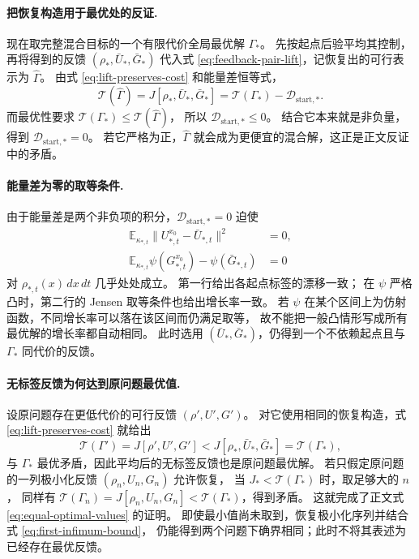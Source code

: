 \documentclass[UTF8,a4paper,11pt,fontset=fandol]{ctexart}
\begin{document}
\paragraph{把恢复构造用于最优处的反证.}
现在取完整混合目标的一个有限代价全局最优解 $\Gamma_*$。
先按起点后验平均其控制，再将得到的反馈 $(\rho_*,\bar U_*,\bar G_*)$
代入式 \eqref{eq:feedback-pair-lift}，记恢复出的可行表示为 $\widehat\Gamma$。
由式 \eqref{eq:lift-preserves-cost} 和能量差恒等式，
\begin{equation}
\mathcal T(\widehat\Gamma)
=J[\rho_*,\bar U_*,\bar G_*]
=\mathcal T(\Gamma_*)-\mathcal D_{\mathrm{start},*}.
\end{equation}
而最优性要求 $\mathcal T(\Gamma_*)\le\mathcal T(\widehat\Gamma)$，
所以 $\mathcal D_{\mathrm{start},*}\le0$。
结合它本来就是非负量，得到 $\mathcal D_{\mathrm{start},*}=0$。
若它严格为正，$\widehat\Gamma$ 就会成为更便宜的混合解，这正是正文反证中的矛盾。

\paragraph{能量差为零的取等条件.}
由于能量差是两个非负项的积分，$\mathcal D_{\mathrm{start},*}=0$ 迫使
\begin{equation}
\begin{aligned}
\mathbb E_{\kappa_{*,t}}\|U_{*,t}^{x_0}-\bar U_{*,t}\|^2&=0,\\
\mathbb E_{\kappa_{*,t}}\psi(G_{*,t}^{x_0})-\psi(\bar G_{*,t})&=0
\end{aligned}
\end{equation}
对 $\rho_{*,t}(x)\,dx\,dt$ 几乎处处成立。
第一行给出各起点标签的漂移一致；
在 $\psi$ 严格凸时，第二行的 Jensen 取等条件也给出增长率一致。
若 $\psi$ 在某个区间上为仿射函数，不同增长率可以落在该区间而仍满足取等，
故不能把一般凸情形写成所有最优解的增长率都自动相同。
此时选用 $(\bar U_*,\bar G_*)$，仍得到一个不依赖起点且与 $\Gamma_*$ 同代价的反馈。

\paragraph{无标签反馈为何达到原问题最优值.}
设原问题存在更低代价的可行反馈 $(\rho',U',G')$。
对它使用相同的恢复构造，式 \eqref{eq:lift-preserves-cost} 就给出
\begin{equation}
\mathcal T(\Gamma')=J[\rho',U',G']
<J[\rho_*,\bar U_*,\bar G_*]=\mathcal T(\Gamma_*),
\end{equation}
与 $\Gamma_*$ 最优矛盾，因此平均后的无标签反馈也是原问题最优解。
若只假定原问题的一列极小化反馈 $(\rho_n,U_n,G_n)$ 允许恢复，
当 $J_*<\mathcal T(\Gamma_*)$ 时，取足够大的 $n$，
同样有 $\mathcal T(\Gamma_n)=J[\rho_n,U_n,G_n]<\mathcal T(\Gamma_*)$，得到矛盾。
这就完成了正文式 \eqref{eq:equal-optimal-values} 的证明。
即使最小值尚未取到，恢复极小化序列并结合式 \eqref{eq:first-infimum-bound}，
仍能得到两个问题下确界相同；此时不将其表述为已经存在最优反馈。
\end{document}
